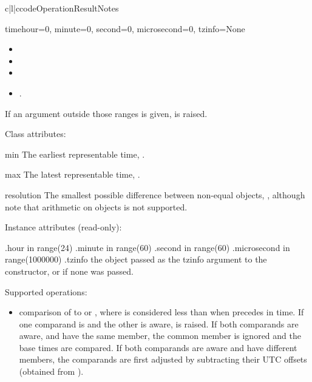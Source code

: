 \begin{tableiii}{c|l|c}{code}{Operation}{Result}{Notes}
\begin{funcdesc}{time}{hour=0, minute=0, second=0, microsecond=0, tzinfo=None}
\begin{itemize}
  \item {}
  \item {}
  \item {}
  \item {}.
\end{itemize}

    If an argument outside those ranges is given,
     is raised.
\end{funcdesc}

Class attributes:

\begin{memberdesc}{min}
        The earliest representable time, .
\end{memberdesc}

\begin{memberdesc}{max}
        The latest representable time, .
\end{memberdesc}

\begin{memberdesc}{resolution}
        The smallest possible difference between non-equal 
        objects, , although note that
        arithmetic on  objects is not supported.
\end{memberdesc}

Instance attributes (read-only):

    .hour           in range(24)
    .minute         in range(60)
    .second         in range(60)
    .microsecond    in range(1000000)
    .tzinfo         the object passed as the tzinfo argument to the
                     constructor, or  if none
                    was passed.

Supported operations:

\begin{itemize}
  \item
    comparison of  to  or ,
    where  is considered less than  when  precedes
     in time.  If one comparand is {\naive} and the other is aware,
     is raised.  If both comparands are aware, and
    have the same  member, the common 
    member is ignored and the base times are compared.  If both
    comparands are aware and have different  members,
    the comparands are first adjusted by subtracting their UTC offsets
    (obtained from ).


\end{itemize}
\end{tableiii}
